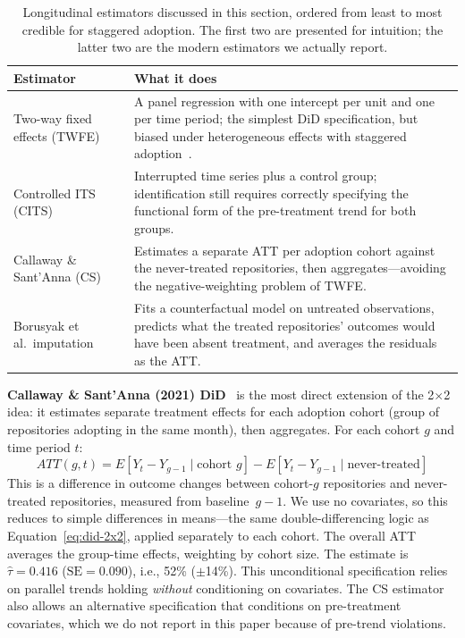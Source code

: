 \begin{table}[t]
\centering
\caption{Longitudinal estimators discussed in this section, ordered from least to most credible for staggered adoption.
The first two are presented for intuition; the latter two are the modern estimators we actually report.}
\label{tab:longitudinal-estimators}
\footnotesize
\begin{tabularx}{\linewidth}{@{} p{4.0cm} X @{}}
\toprule
\textbf{Estimator} & \textbf{What it does} \\
\midrule
Two-way fixed effects (TWFE)
  & A panel regression with one intercept per unit and one per time period; the simplest DiD specification, but biased under heterogeneous effects with staggered adoption~\cite{goodman2021difference, dechaisemartin2020two}. \\
\addlinespace
Controlled ITS (CITS)~\cite{bernal2017interrupted}
  & Interrupted time series plus a control group; identification still requires correctly specifying the functional form of the pre-treatment trend for both groups. \\
\addlinespace
Callaway \& Sant'Anna (CS)~\cite{callaway2021difference}
  & Estimates a separate ATT per adoption cohort against the never-treated repositories, then aggregates---avoiding the negative-weighting problem of TWFE. \\
\addlinespace
Borusyak et al.\ imputation~\cite{borusyak2024revisiting}
  & Fits a counterfactual model on untreated observations, predicts what the treated repositories' outcomes would have been absent treatment, and averages the residuals as the ATT. \\
\bottomrule
\end{tabularx}
\end{table}

\textbf{Callaway \& Sant'Anna (2021) DiD}~\cite{callaway2021difference} is the most direct extension of the 2$\times$2 idea: it estimates separate treatment effects for each adoption cohort (group of repositories adopting in the same month), then aggregates.
For each cohort $g$ and time period $t$:
\begin{equation}
\label{eq:cs-att-gt}
ATT(g, t) = E[Y_t - Y_{g-1} \mid \text{cohort } g] - E[Y_t - Y_{g-1} \mid \text{never-treated}]
\end{equation}
This is a difference in outcome changes between cohort-$g$ repositories and never-treated repositories, measured from baseline~$g\!-\!1$.
We use no covariates, so this reduces to simple differences in means---the same double-differencing logic as Equation~\ref{eq:did-2x2}, applied separately to each cohort.
The overall ATT averages the group-time effects, weighting by cohort size.
The estimate is $\hat{\tau} = 0.416$ ($\text{SE} = 0.090$), i.e., 52\% ($\pm$14\%).
This unconditional specification relies on parallel trends holding \emph{without} conditioning on covariates.
The CS estimator also allows an alternative specification that conditions on pre-treatment covariates, which we do not report in this paper because of pre-trend violations.

